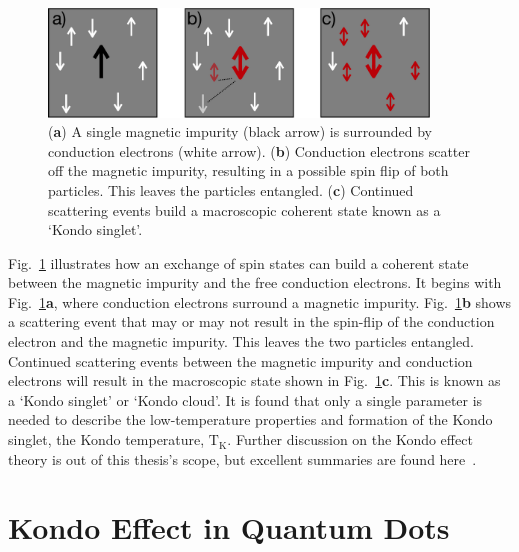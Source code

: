 \begin{figure}[!hbt]
 \begin{center}
  \includegraphics[width=0.9\textwidth]{figures/ch2/figure10.pdf}
  \caption[Kondo Effect Illustration : Bulk Material]{\label{fig:ch2/kondo_bulkdiagram} 
  (\textbf{a}) A single magnetic impurity (black arrow) is surrounded by conduction electrons (white arrow). (\textbf{b}) Conduction electrons scatter off the magnetic impurity, resulting in a possible spin flip of both particles. This leaves the particles entangled. (\textbf{c}) Continued scattering events build a macroscopic coherent state known as a `Kondo singlet'.
   }
 \end{center}
\end{figure}


Fig.~\ref{fig:ch2/kondo_bulkdiagram} illustrates how an exchange of spin states can build a coherent state between the magnetic impurity and the free conduction electrons. It begins with Fig.~\ref{fig:ch2/kondo_bulkdiagram}\textbf{a}, where conduction electrons surround a magnetic impurity. 
Fig.~\ref{fig:ch2/kondo_bulkdiagram}\textbf{b} shows a scattering event that may or may not result in the spin-flip of the conduction electron and the magnetic impurity. This leaves the two particles entangled. Continued scattering events between the magnetic impurity and conduction electrons will result in the macroscopic state shown in Fig.~\ref{fig:ch2/kondo_bulkdiagram}\textbf{c}. This is known as a `Kondo singlet' or `Kondo cloud'. It is found that only a single parameter is needed to describe the low-temperature properties and formation of the Kondo singlet, the Kondo temperature, $\mathrm{T_K}$. Further discussion on the Kondo effect theory is out of this thesis's scope, but excellent summaries are found here~\cite{kondo_review, Mahan2000, kondo_theory_history}. 




\afterpage{\clearpage}
\section{Kondo Effect in Quantum Dots}

